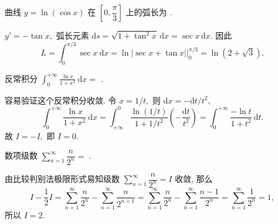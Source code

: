 \begin{question}
曲线 $y = \ln(\cos x)$ 在 $\left[0, \dfrac{\pi}{3}\right]$ 上的弧长为 \fillin[$\ln(2+\sqrt{3})$].
\end{question}

\begin{solution}
$y' = -\tan x,$ 弧长元素 $\mathrm{d}s = \sqrt{1 + \tan^2 x}\,\mathrm{d}x = \sec x\,\mathrm{d}x.$ 因此
\begin{equation*}
L = \int_0^{\pi/3} \sec x ~ \mathrm{d}x = \ln|\sec x + \tan x| \big|_0^{\pi/3} = \ln(2 + \sqrt{3}).
\end{equation*}
\end{solution}


\begin{question}  %
反常积分 $\displaystyle \int_0^{+\infty} \frac{\ln x}{1+x^2} ~ \mathrm{d}x =$ \fillin[$0$].
\end{question}

\begin{solution}
容易验证这个反常积分收敛. 令 $x = 1/t,$ 则 $\mathrm{d}x = -\mathrm{d}t/t^2,$
\begin{equation*}
\int_0^{+\infty} \frac{\ln x}{1+x^2} ~ \mathrm{d}x = \int_{+\infty}^0 \frac{\ln(1/t)}{1+1/t^2}\left(-\frac{\mathrm{d}t}{t^2}\right) = \int_0^{+\infty} \frac{-\ln t}{1+t^2} ~ \mathrm{d}t.
\end{equation*}
故 $I = -I,$ 即 $I = 0.$
\end{solution}


\begin{question}
数项级数 $\displaystyle \sum_{n=1}^{\infty} \dfrac{n}{2^n} =$ \fillin[$2$].
\end{question}

\begin{solution}
由比较判别法极限形式易知级数 $\displaystyle \sum_{n=1}^{\infty} \dfrac{n}{2^n} = I$ 收敛, 那么
\[
I - \frac{1}{2} I = \sum_{n=1}^{\infty} \dfrac{n}{2^n} - \sum_{n=1}^{\infty} \dfrac{n}{2^{n+1}} = \sum_{n=1}^{\infty} \dfrac{n}{2^n} - \sum_{n=1}^{\infty} \dfrac{n-1}{2^n} = \sum_{n=1}^{\infty} \dfrac{1}{2^n} = 1,
\]
所以 $I = 2.$

\end{solution}

